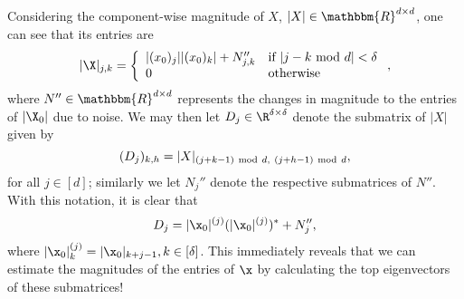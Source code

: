 Considering the component-wise magnitude of $X$, $|X| \in \mathbbm{R}^{d \times d}$, one can see that its entries are 
\begin{equation*}
|\X|_{j,k} =  \left\{ \begin{array}{ll} |({x}_0)_j| |({x}_0)_{k}| + N''_{j,k} & \textrm{if}~| j - k ~{\rm mod}~d | < \delta \\ 0 & \textrm{otherwise} \end{array} \right.,
\end{equation*}
where $N'' \in \mathbbm{R}^{d \times d}$ represents the changes in magnitude to the entries of $|\X_0|$ due to noise. %
We may then let $D_j \in \R^{\delta \times \delta}$ denote the submatrix of $|X|$ given by \[(D_j)_{k,h} = |X|_{(j+k-1)~{\rm mod}~d,~(j+h-1)~{\rm mod}~d},\] for all $j \in [d]$; similarly we let $N_j''$ denote the respective submatrices of $N''$.  With this notation, it is clear that \[D_j = |\x_0|^{(j)} (|\x_0|^{(j)})^* + N_j'',\] where $|\x_0|^{(j)}_k = |\x_0|_{k + j - 1}, k \in [\delta]$.  This immediately reveals that we can estimate the magnitudes of the entries of $\x$ by calculating the top eigenvectors of these submatrices!

